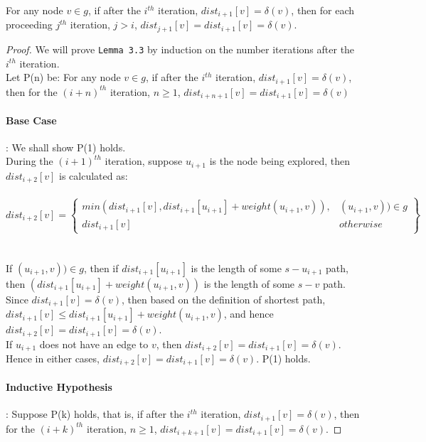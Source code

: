 \begin{sublemma}
For any node $v \in g$, if after the $i^{th}$ iteration, $dist_{i+1}[v] = \delta(v)$, then for each proceeding $j^{th}$ iteration, $j > i$, $dist_{j+1}[v] = dist_{i+1}[v] = \delta(v)$. 
\end{sublemma}
\begin{proof}
We will prove \texttt{Lemma 3.3} by induction on the number iterations after the $i^{th}$ iteration. 
\\
Let P(n) be: For any node $v \in g$, if after the $i^{th}$ iteration, $dist_{i+1}[v] = \delta(v)$, then for the $(i+n)^{th}$ iteration, $n \geq 1$, $dist_{i+n+1}[v] = dist_{i+1}[v] = \delta(v)$

\paragraph*{Base Case}: We shall show P(1) holds. 
\\
During the $(i+1)^{th}$ iteration, suppose $u_{i+1}$ is the node being explored, then $dist_{i+2}[v]$ is calculated as: 
\\\\
\tab\[
        dist_{i+2}[v] = \left.
       \begin{cases} 
          min(dist_{i+1}[v], dist_{i+1}[u_{i+1}] + weight(u_{i+1}, v)), & (u_{i+1}, v)) \in g \\ 
          dist_{i+1}[v] & otherwise 
        \end{cases}
        \right\}
      \]
\\\\
If $(u_{i+1}, v)) \in g $, then if $dist_{i+1}[u_{i+1}]$ is the length of some $s-u_{i+1}$ path, then $(dist_{i+1}[u_{i+1}] + weight(u_{i+1}, v))$ is the length of some $s-v$ path. Since $dist_{i+1}[v] = \delta(v)$, then based on the definition of shortest path, $dist_{i+1}[v] \leq dist_{i+1}[u_{i+1}] + weight(u_{i+1}, v)$, and hence $dist_{i+2}[v] = dist_{i+1}[v] = \delta(v)$. 
\\
If $u_{i+1}$ does not have an edge to $v$, then $dist_{i+2}[v] = dist_{i+1}[v] = \delta(v)$. 
\\
Hence in either cases, $dist_{i+2}[v] = dist_{i+1}[v] = \delta(v)$. P(1) holds. 


\paragraph*{Inductive Hypothesis}: Suppose P(k) holds, that is, if after the $i^{th}$ iteration, $dist_{i+1}[v] = \delta(v)$, then for the $(i+k)^{th}$ iteration, $n \geq 1$, $dist_{i+k+1}[v] = dist_{i+1}[v] = \delta(v)$. 



\end{proof}
